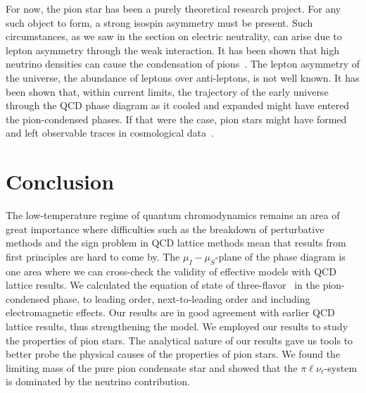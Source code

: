 For now, the pion star has been a purely theoretical research project.
For any such object to form, a strong isospin asymmetry must be present.
Such circumstances, as we saw in the section on electric neutrality, can arise due to lepton asymmetry through the weak interaction.
It has been shown that high neutrino densities can cause the condensation of pions~\autocite{abukiPionCondensationDense2009}.
The lepton asymmetry of the universe, the abundance of leptons over anti-leptons, is not well known.
It has been shown that, within current limits, the trajectory of the early universe through the QCD phase diagram as it cooled and expanded might have entered the pion-condensed phases.
If that were the case, pion stars might have formed and left observable traces in cosmological data~\autocite{vovchenkoPionCondensationEarly2021,wygasCosmicQCDEpoch2018}.



\section{Conclusion}

The low-temperature regime of quantum chromodynamics remains an area of great importance where difficulties such as the breakdown of perturbative methods and the sign problem in QCD lattice methods mean that results from first principles are hard to come by.
The $\mu_I-\mu_S$-plane of the phase diagram is one area where we can cross-check the validity of effective models with QCD lattice results.
We calculated the equation of state of three-flavor \chpt\, in the pion-condensed phase, to leading order, next-to-leading order and including electromagnetic effects. 
Our results are in good agreement with earlier QCD lattice results, thus strengthening the model.
We employed our results to study the properties of pion stars.
The analytical nature of our results gave us tools to better probe the physical causes of the properties of pion stars.
We found the limiting mass of the pure pion condensate star and showed that the $\pi\ell\nu_\ell$-system is dominated by the neutrino contribution.

